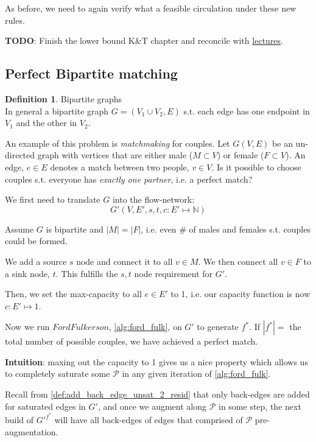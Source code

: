 \documentclass{article}
\theoremstyle{definition}
\newtheorem{definition}{Definition}[section]
\begin{document}
As before, we need to again verify what a feasible circulation under these new rules.

\textbf{TODO}: Finish the lower bound K\&T chapter and reconcile with \href{https://classroom.udacity.com/courses/ud401/lessons/98e96502-88a9-4c08-9737-5bfce78d6248/concepts/12561c77-2bcd-45e0-aae5-e7c4d57eb2ef}{lectures}.

\subsection{Perfect Bipartite matching}
\begin{definition}{Bipartite graphs}
	\label{def:bipartite_graphs}
	\\In general a bipartite graph $G=(V_1 \cup V_2, E)$ s.t. each edge has one endpoint in $V_1$ and the other in $V_2$.
\end{definition}

An example of this problem is \textit{matchmaking} for couples. Let $G(V,E)$ be an un-directed graph with vertices that are either male ($M \subset V$) or female ($F \subset V$). An edge, $e \in E$ denotes a match between two people, $v \in V$. Is it possible to choose couples s.t. everyone has \textit{exactly one partner}, i.e. a perfect match?

We first need to translate $G$ into the flow-network: $$G'(V,E',s,t,c: E' \mapsto \mathbb{N})$$

Assume $G$ is bipartite and $|M|=|F|$, i.e. even \# of males and females s.t. couples could be formed.

We add a source $s$ node and connect it to all $v \in M$. We then connect all $v \in F$ to a sink node, $t$. This fulfills the $s,t$ node requirement for $G'$.

Then, we set the max-capacity to all $e \in E'$ to 1, i.e. our capacity function is now $c : E' \mapsto 1$.

Now we run $FordFulkerson$, \ref{alg:ford_fulk}, on $G'$ to generate $f^*$. If $|f^*| = $ the total number of possible couples, we have achieved a perfect match.

\textbf{Intuition}: maxing out the capacity to 1 gives us a nice property which allows us to completely saturate some $\mathcal{P}$ in any given iteration of \ref{alg:ford_fulk}. 

Recall from \ref{def:add_back_edge_unsat_2_resid} that only back-edges are added for saturated edges in $G'$, and once we augment along $\mathcal{P}$ in some step, the next build of ${G'}^{f^*}$ will have all back-edges of edges that comprised of $\mathcal{P}$ pre-augmentation. 
\end{document}
